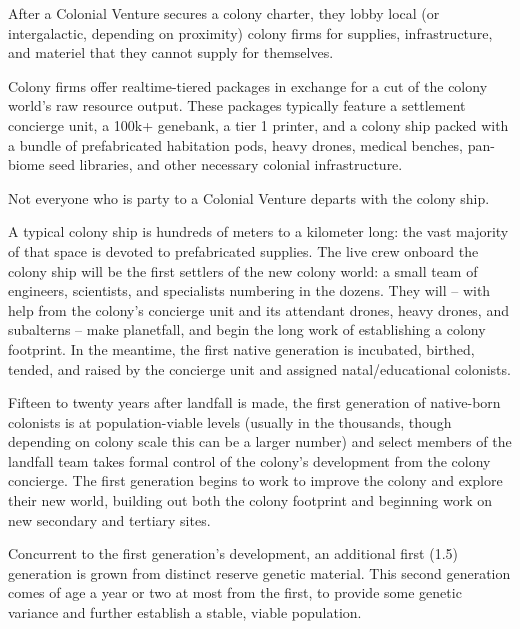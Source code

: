 After a Colonial Venture secures a colony charter, they lobby local (or intergalactic, depending on  
proximity) colony firms for supplies, infrastructure, and materiel that they cannot supply for  
themselves. 
 

Colony firms offer realtime-tiered packages in exchange for a cut of the colony world’s raw  
resource output. These packages typically feature a settlement concierge unit, a 100k+  
genebank, a tier 1 printer, and a colony ship packed with a bundle of prefabricated habitation  
pods, heavy drones, medical benches, pan-biome seed libraries, and other necessary colonial  
infrastructure. 
 

Not everyone who is party to a Colonial Venture departs with the colony ship. 
 

A typical colony ship is hundreds of meters to a kilometer long: the vast majority of that space is  
devoted to prefabricated supplies. The live crew onboard the colony ship will be the first settlers  
of the new colony world: a small team of engineers, scientists, and specialists numbering in the  
dozens. They will -- with help from the colony’s concierge unit and its attendant drones, heavy  
drones, and subalterns -- make planetfall, and begin the long work of establishing a colony  
footprint. In the meantime, the first native generation is incubated, birthed, tended, and raised by  
the concierge unit and assigned natal/educational colonists. 
 

Fifteen to twenty years after landfall is made, the first generation of native-born colonists is at  
population-viable levels (usually in the thousands, though depending on colony scale this can be  
a larger number) and select members of the landfall team takes formal control of the colony’s  
development from the colony concierge. The first generation begins to work to improve the  
colony and explore their new world, building out both the colony footprint and beginning work on  
new secondary and tertiary sites. 
 

Concurrent to the first generation’s development, an additional first (1.5) generation is grown  
from distinct reserve genetic material. This second generation comes of age a year or two at  
most from the first, to provide some genetic variance and further establish a stable, viable  
population. 
 

                                                                                                            


